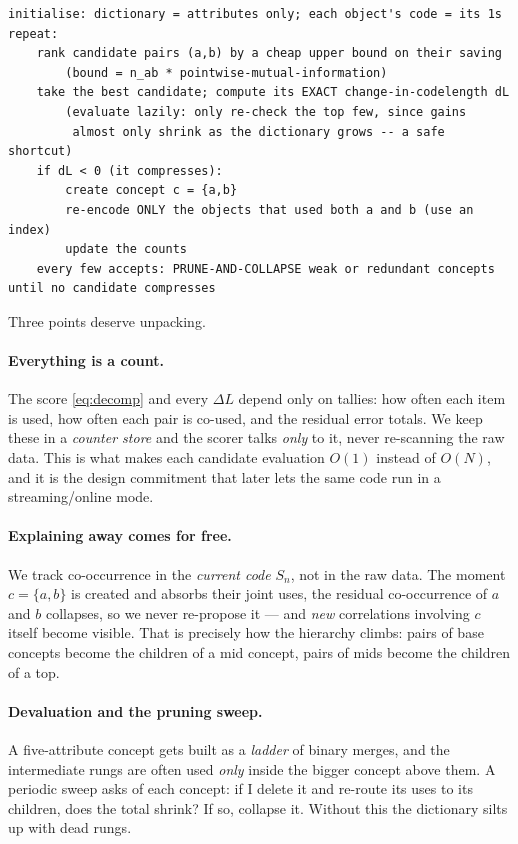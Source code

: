 \documentclass[11pt]{article}
\newcommand{\CL}{L}                       %
\begin{document}
\begin{lstlisting}
initialise: dictionary = attributes only; each object's code = its 1s
repeat:
    rank candidate pairs (a,b) by a cheap upper bound on their saving
        (bound = n_ab * pointwise-mutual-information)
    take the best candidate; compute its EXACT change-in-codelength dL
        (evaluate lazily: only re-check the top few, since gains
         almost only shrink as the dictionary grows -- a safe shortcut)
    if dL < 0 (it compresses):
        create concept c = {a,b}
        re-encode ONLY the objects that used both a and b (use an index)
        update the counts
    every few accepts: PRUNE-AND-COLLAPSE weak or redundant concepts
until no candidate compresses
\end{lstlisting}

Three points deserve unpacking.

\paragraph{Everything is a count.} The score \eqref{eq:decomp} and every
$\Delta\CL$ depend only on tallies: how often each item is used, how often each
pair is co-used, and the residual error totals. We keep these in a
\emph{counter store} and the scorer talks \emph{only} to it, never re-scanning
the raw data. This is what makes each candidate evaluation $O(1)$ instead of
$O(N)$, and it is the design commitment that later lets the same code run in a
streaming/online mode.

\paragraph{Explaining away comes for free.} We track co-occurrence in the
\emph{current code} $S_n$, not in the raw data. The moment $c=\{a,b\}$ is
created and absorbs their joint uses, the residual co-occurrence of $a$ and $b$
collapses, so we never re-propose it --- and \emph{new} correlations involving
$c$ itself become visible. That is precisely how the hierarchy climbs: pairs of
base concepts become the children of a mid concept, pairs of mids become the
children of a top.

\paragraph{Devaluation and the pruning sweep.} A five-attribute concept gets
built as a \emph{ladder} of binary merges, and the intermediate rungs are often
used \emph{only} inside the bigger concept above them. A periodic sweep asks of
each concept: if I delete it and re-route its uses to its children, does the
total shrink? If so, collapse it. Without this the dictionary silts up with dead
rungs.
\end{document}

